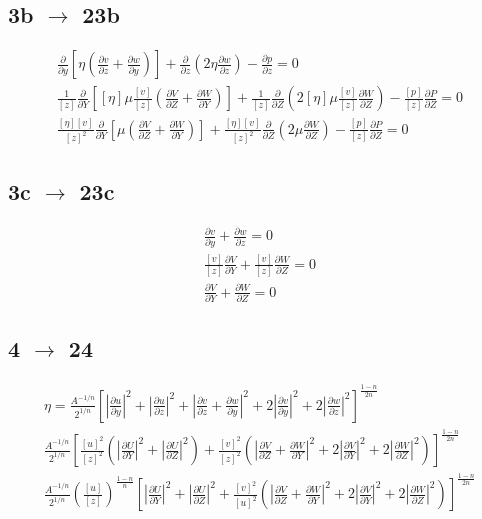\documentclass[10pt, letterpaper, twoside]{article}
\newcommand{\pd}[2]{\frac{\partial#1}{\partial#2}}
\begin{document}
	\subsection{3b $ \rightarrow $ 23b}
	\begin{gather*}
		\pd{}{y}\left[\eta\left(\pd{v}{z}+\pd{w}{y}\right)\right] + \pd{}{z}\left(2\eta\pd{w}{z}\right) - \pd{p}{z} = 0 \tag{3b} \\
		\frac{1}{\left[z\right]}\pd{}{Y}\left[\left[\eta\right]\mu\frac{\left[v\right]}{\left[z\right]}\left(\pd{V}{Z}+\pd{W}{Y}\right)\right] + \frac{1}{\left[z\right]}\pd{}{Z}\left(2\left[\eta\right]\mu\frac{\left[v\right]}{\left[z\right]}\pd{W}{Z}\right) - \frac{\left[p\right]}{\left[z\right]}\pd{P}{Z} = 0\\
		\frac{\left[\eta\right]\left[v\right]}{\left[z\right]^2}\pd{}{Y}\left[\mu\left(\pd{V}{Z}+\pd{W}{Y}\right)\right] + \frac{\left[\eta\right]\left[v\right]}{\left[z\right]^2}\pd{}{Z}\left(2\mu\pd{W}{Z}\right) - \frac{\left[p\right]}{\left[z\right]}\pd{P}{Z} = 0 \tag{3b$'$}
	\end{gather*}
	\subsection{3c $ \rightarrow $ 23c}
	\begin{gather*}
		\pd{v}{y} + \pd{w}{z} = 0 \tag{3c} \\
		\frac{\left[v\right]}{\left[z\right]}\pd{V}{Y} + \frac{\left[v\right]}{\left[z\right]}\pd{W}{Z} = 0\\
		\pd{V}{Y} + \pd{W}{Z} = 0 \tag{23c}
	\end{gather*}
	\subsection{4 $ \rightarrow $ 24}
	\begin{gather*}
		\eta = \frac{A^{-1/n}}{2^{1/n}}\left[\left|\pd{u}{y}\right|^2 + \left|\pd{u}{z}\right|^2 + \left|\pd{v}{z} + \pd{w}{y}\right|^2 + 2\left|\pd{v}{y}\right|^2 + 2\left|\pd{w}{z}\right|^2\right]^{\frac{1-n}{2n}} \tag{4} \\
		\frac{A^{-1/n}}{2^{1/n}}\left[\frac{\left[u\right]^2}{\left[z\right]^2}\left(\left|\pd{U}{Y}\right|^2 + \left|\pd{U}{Z}\right|^2\right) + \frac{\left[v\right]^2}{\left[z\right]^2}\left(\left|\pd{V}{Z} + \pd{W}{Y}\right|^2 + 2\left|\pd{V}{Y}\right|^2 + 2\left|\pd{W}{Z}\right|^2\right)\right]^{\frac{1-n}{2n}}\\
		\frac{A^{-1/n}}{2^{1/n}}\left(\frac{\left[u\right]}{\left[z\right]}\right)^{\frac{1-n}{n}}\left[\left|\pd{U}{Y}\right|^2 + \left|\pd{U}{Z}\right|^2 + \frac{\left[v\right]^2}{\left[u\right]^2}\left(\left|\pd{V}{Z} + \pd{W}{Y}\right|^2 + 2\left|\pd{V}{Y}\right|^2 + 2\left|\pd{W}{Z}\right|^2\right)\right]^{\frac{1-n}{2n}} \tag{4$'$}
	\end{gather*}
\end{document}

